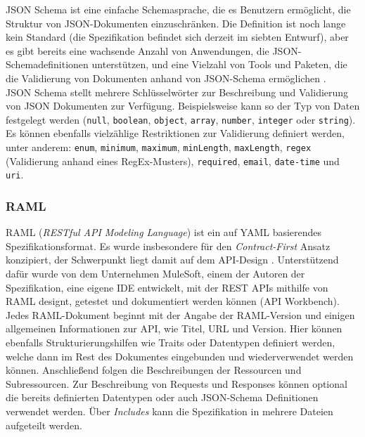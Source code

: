 JSON Schema ist eine einfache Schemasprache, die es Benutzern ermöglicht, die Struktur von JSON-Dokumenten einzuschränken. Die Definition ist noch lange kein Standard (die Spezifikation befindet sich derzeit im siebten Entwurf), aber es gibt bereits eine wachsende Anzahl von Anwendungen, die JSON-Schemadefinitionen unterstützen, und eine Vielzahl von Tools und Paketen, die die Validierung von Dokumenten anhand von JSON-Schema ermöglichen \parencite[264]{pezoa2016foundations}. \\

JSON Schema stellt mehrere Schlüsselwörter zur Beschreibung und Validierung von JSON Dokumenten zur Verfügung. Beispielsweise kann so der Typ von Daten festgelegt werden (\lstinline|null|, \lstinline|boolean|, \lstinline|object|, \lstinline|array|, \lstinline|number|, \lstinline|integer| oder \lstinline|string|). Es können ebenfalls vielzählige Restriktionen zur Validierung definiert werden, unter anderem: \lstinline|enum|, \lstinline|minimum|, \lstinline|maximum|, \lstinline|minLength|, \lstinline|maxLength|, \lstinline|regex| (Validierung anhand eines RegEx-Musters), \lstinline|required|, \lstinline|email|, \lstinline|date-time| und \lstinline|uri|.

\subsubsection{RAML}
RAML (\emph{RESTful API Modeling Language}) ist ein auf YAML basierendes Spezifikationsformat. Es wurde insbesondere für den \emph{Contract-First} Ansatz konzipiert, der Schwerpunkt liegt damit auf dem API-Design \parencites[277]{spichale2017api}[165]{tilkov2015rest}. Unterstützend dafür wurde von dem Unternehmen MuleSoft, einem der Autoren der Spezifikation, eine eigene IDE entwickelt, mit der REST APIs mithilfe von RAML designt, getestet und dokumentiert werden können (API Workbench). \\

Jedes RAML-Dokument beginnt mit der Angabe der RAML-Version und einigen allgemeinen Informationen zur API, wie Titel, URL und Version. Hier können ebenfalls Strukturierungshilfen wie Traits oder Datentypen definiert werden, welche dann im Rest des Dokumentes eingebunden und wiederverwendet werden können. Anschließend folgen die Beschreibungen der Ressourcen und Subressourcen. Zur Beschreibung von Requests und Responses können optional die bereits definierten Datentypen oder auch JSON-Schema Definitionen verwendet werden. Über \emph{Includes} kann die Spezifikation in mehrere Dateien aufgeteilt werden.

